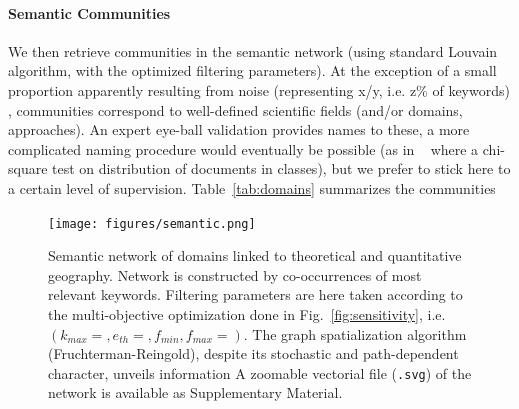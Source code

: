 \paragraph{Semantic Communities}

We then retrieve communities in the semantic network (using standard Louvain algorithm, with the optimized filtering parameters). At the exception of a small proportion apparently resulting from noise (representing x/y, i.e. z\% of keywords) %
, communities correspond to well-defined scientific fields (and/or domains, approaches). An expert eye-ball validation provides names to these, a more complicated naming procedure would eventually be possible (as in ~\cite{} %
 where a chi-square test on distribution of documents in classes), but we prefer to stick here to a certain level of supervision. Table~\ref{tab:domains} summarizes the communities 




\begin{figure}
\hspace{-2cm}
\texttt{[image: figures/semantic.png]}
\caption[Semantic network of concepts in quantitative geography]{Semantic network of domains linked to theoretical and quantitative geography. Network is constructed by co-occurrences of most relevant keywords. Filtering parameters are here taken according to the multi-objective optimization done in Fig.~\ref{fig:sensitivity}, i.e. $(k_{max}=,e_{th}=,f_{min},f_{max}=)$. The graph spatialization algorithm (Fruchterman-Reingold), despite its stochastic and path-dependent character, unveils information  A zoomable vectorial file (\texttt{.svg}) of the network is available as Supplementary Material.}
\label{fig:quantepistemo:semanticnw}
\end{figure}





